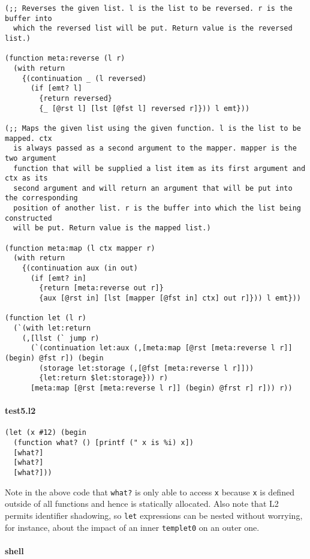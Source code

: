 \documentclass[]{article}
\let\oldparagraph\paragraph
\renewcommand{\paragraph}[1]{\oldparagraph{#1}\mbox{}}
\begin{document}
\begin{verbatim}
(;; Reverses the given list. l is the list to be reversed. r is the buffer into
  which the reversed list will be put. Return value is the reversed list.)

(function meta:reverse (l r)
  (with return
    {(continuation _ (l reversed)
      (if [emt? l]
        {return reversed}
        {_ [@rst l] [lst [@fst l] reversed r]})) l emt}))

(;; Maps the given list using the given function. l is the list to be mapped. ctx
  is always passed as a second argument to the mapper. mapper is the two argument
  function that will be supplied a list item as its first argument and ctx as its
  second argument and will return an argument that will be put into the corresponding
  position of another list. r is the buffer into which the list being constructed
  will be put. Return value is the mapped list.)

(function meta:map (l ctx mapper r)
  (with return
    {(continuation aux (in out)
      (if [emt? in]
        {return [meta:reverse out r]}
        {aux [@rst in] [lst [mapper [@fst in] ctx] out r]})) l emt}))

(function let (l r)
  (`(with let:return
    (,[llst (` jump r)
      (`(continuation let:aux (,[meta:map [@rst [meta:reverse l r]] (begin) @fst r]) (begin
        (storage let:storage (,[@fst [meta:reverse l r]]))
        {let:return $let:storage})) r)
      [meta:map [@rst [meta:reverse l r]] (begin) @frst r] r])) r))
\end{verbatim}

\paragraph{test5.l2}\label{test5.l2}

\begin{verbatim}
(let (x #12) (begin
  (function what? () [printf (" x is %i) x])
  [what?]
  [what?]
  [what?]))
\end{verbatim}

Note in the above code that \texttt{what?} is only able to access
\texttt{x} because \texttt{x} is defined outside of all functions and
hence is statically allocated. Also note that L2 permits identifier
shadowing, so \texttt{let} expressions can be nested without worrying,
for instance, about the impact of an inner \texttt{templet0} on an outer
one.

\paragraph{shell}\label{shell-4}
\end{document}
